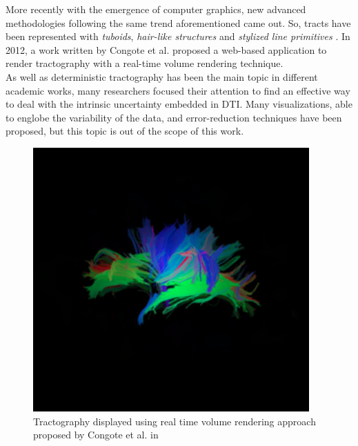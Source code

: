 \documentclass{article}
\begin{document}
\begin{multicols}{2}
More recently with the emergence of computer graphics, new advanced methodologies following the same trend aforementioned came out. So, tracts have been represented with \textit{tuboids}\cite{petrovic2007visualizing}, \textit{hair-like structures} \cite{peeters2006visualization} and \textit{stylized line primitives} \cite{stoll2005visualization}. In 2012, a work written by Congote et al. proposed a web-based application to render tractography \cite{congote2012real} with a real-time volume rendering technique. \\
As well as deterministic tractography has been the main topic in different academic works, many researchers focused their attention to find an effective way to deal with the intrinsic uncertainty embedded in DTI. Many visualizations, able to englobe the variability of the data, and error-reduction techniques have been proposed, but this topic is out of the scope of this work.


\begin{figure}[H]
\centering
\includegraphics[width = 0.8\columnwidth]{realTimeTractography}
\caption{Tractography displayed using real time volume rendering approach proposed by Congote et al. in \cite{congote2012real}}
\label{fig:weightedGraph}
\end{figure}



\end{multicols}
\end{document}

